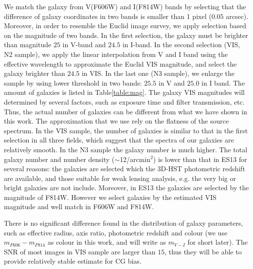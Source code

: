\documentclass[useAMS,usenatbib]{mn2e}
\begin{document}
We match the galaxy from V(F606W) and I(F814W) bands by selecting that
the difference of galaxy coordinates in two bands is smaller than 1
pixel ($0.05$ arcsec). Moreover, in order to resemble the Euclid image
survey, we apply selection based on the magnitude of two bands. In the
first selection, the galaxy must be brighter than magnitude $25$ in
V-band and $24.5$ in I-band. In the second selection (VIS, N2 sample),
we apply the linear interpolation from V and I band using the
effective wavelength to approximate the Euclid VIS magnitude, and
select the galaxy brighter than $24.5$ in VIS. In the last one (N3
sample), we enlarge the sample by using lower threshold in two bands:
$25.5$ in V and $25.0$ in I band. The amount of galaxies is listed in
Table\ref{table:mag}.
%
The galaxy VIS magnitudes will determined by several factors, such as
exposure time and filter transmission, etc. Thus, the actual number of
galaxies can be different from what we have shown in this work. The
approximation that we use rely on the flatness of the source
spectrum. In the VIS sample, the number of galaxies is similar to that in
the first selection in all three fields, which suggest that the
spectra of our galaxies are relatively smooth. In the N3 sample the galaxy
number is much higher.
%
The total galaxy number and number density ($\sim$12/arcmin$^2$) is
lower than that in ES13 for several reasons: the galaxies are selected
which the 3D-HST photometric redshift are available, and those
suitable for weak lensing analysis, e.g. the very big or bright
galaxies are not include. Moreover, in ES13 the galaxies are selected
by the magnitude of F814W. However we select galaxies by the estimated
VIS magnitude and well match in F606W and F814W.

There is no significant difference found in the distribution of galaxy
parameters, such as effective radius, axis ratio, photometric redshift
and colour (we use $m_{F606}-m_{F814}$ as colour in this work, and
will write as $m_{V-I}$ for short later). The SNR of most images in VIS sample
are larger than $15$, thus they will be able to provide relatively 
stable estimate for CG bias.
\end{document}
